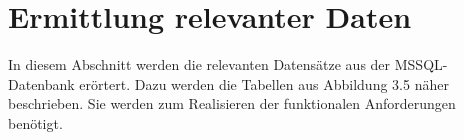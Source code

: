 \section{Ermittlung relevanter Daten}
\label{ch:Systemanalyse:sec:Information}

In diesem Abschnitt werden die relevanten Datensätze aus der MSSQL-Datenbank erörtert. Dazu werden die Tabellen aus Abbildung 3.5 näher beschrieben. Sie werden zum Realisieren der funktionalen Anforderungen benötigt.



